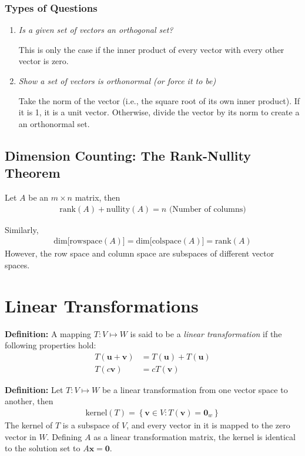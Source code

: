 \documentclass[a4paper,10pt]{report}
\newcommand{\vb}[1]{\mathbf{#1}}		%
\begin{document}
\subsection{Types of Questions}
\begin{enumerate}
	\item
		\textit{Is a given set of vectors an orthogonal set?}

		This is only the case if the inner product of every vector with every other vector is zero.

	\item
		\textit{Show a set of vectors is orthonormal (or force it to be)}

		Take the norm of the vector (i.e., the square root of its own inner product). If it is 1, it is a unit vector. Otherwise, divide the vector by its norm to create a an orthonormal set.
\end{enumerate}


\section{Dimension Counting: The Rank-Nullity Theorem}
  Let $A$ be an $m\times n$ matrix, then
  \begin{align*}
    \text{rank}(A) + \text{nullity}(A) = n \text{ (Number of columns)}
  \end{align*}

  Similarly,
  \begin{align*}
   \text{dim[rowspace}(A)] = \text{dim[colspace}(A)] = \text{rank}(A)
  \end{align*}
  However, the row space and column space are subspaces of different vector spaces.



\chapter{Linear Transformations}

\textbf{Definition: } A mapping $T: V\mapsto W$ is said to be a \textit{linear transformation} if the following properties hold:
\begin{align*}
 T(\vb{u} + \vb{v}) &= T(\vb{u}) + T(\vb{u}) \\
 T(c\vb{v}) &= cT(\vb{v})
\end{align*}

\textbf{Definition: } Let $T: V\mapsto W$ be a linear transformation from one vector space to another, then
\begin{align*}
 \text{kernel}(T)=\left\{\vb{v}\in V : T(\vb{v}) = \vb{0}_w\right\}
\end{align*}
The kernel of $T$ is a subspace of $V$, and every vector in it is mapped to the zero vector in $W$. Defining $A$ as a linear transformation matrix, the kernel is identical to the solution set to $A\vb{x} = \vb{0}$.
\end{document}
